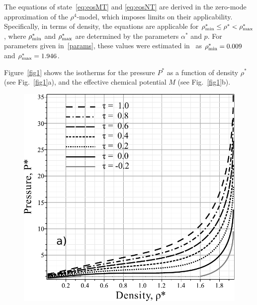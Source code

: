 \documentclass[fleqn,twoside,twocolumn,nofootinbib,showkeys]{revtex4} %
\begin{document}
	The equations of state~\eqref{eq:eosMT} and \eqref{eq:eosNT} are derived in the zero-mode approximation of the $\rho^4$-model, which imposes limits on their applicability. Specifically, in terms of density, the equations are  applicable for $\rho^*_{\rm min} \leq \rho^* < \rho^*_{\rm max}$, where $\rho^*_{\rm min}$ and $\rho^*_{\rm max}$ are determined by the parameters $\alpha^*$ and $p$. For parameters given in~\eqref{params}, these values were estimated in~\cite{KozlovskiiDobush2020} as $\rho^*_{\rm min} = 0.009$ and $\rho^*_{\rm max} = 1.946$.
	
	Figure~\ref{fig1} shows the isotherms for the pressure $P^*$ as a function of density $\rho^*$ (see Fig.~\ref{fig1}a), and the effective chemical potential $M$ (see Fig.~\ref{fig1}b).
	\begin{figure}[h!]
		\includegraphics[width=\column]{f1a1.pdf} 

\end{figure}
\end{document}
